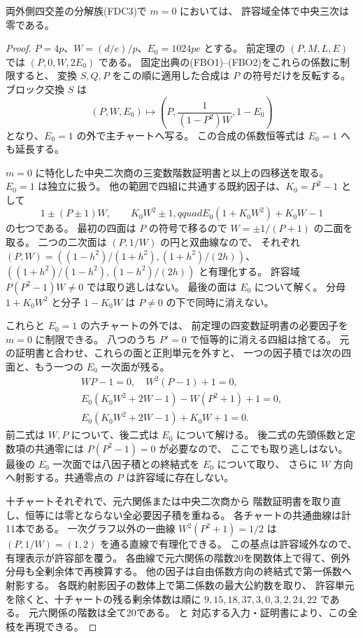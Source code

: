 \begin{proposition}\label{prop:cubic-CY-one-segre-double-split-FDC-mzero}
両外側四交差の分解族(FDC3)で $m=0$ においては、
許容域全体で中央三次は零である。
\end{proposition}
\begin{proof}
$P=4p$、$W=(d/e)/p$、$E_0=1024pe$ とする。
前定理の $(P,M,L,E)$ では $(P,0,W,2E_0)$ である。
固定出典の(FBO1)--(FBO2)をこれらの係数に制限すると、
変換 $S,Q,P$ をこの順に適用した合成は $P$ の符号だけを反転する。
ブロック交換 $S$ は
\[
 (P,W,E_0)\longmapsto
 \left(P,\frac{1}{(1-P^2)W},1-E_0\right)
\]
となり、$E_0=1$ の外で主チャートへ写る。
この合成の係数恒等式は $E_0=1$ へも延長する。

$m=0$ に特化した中央二次商の三変数階数証明書と以上の四移送を取る。
$E_0=1$ は独立に扱う。
他の範囲で四組に共通する既約因子は、$K_0=P^2-1$ として
\[
 1\pm(P\pm1)W,\qquad K_0W^2\pm1,qquad
 E_0(1+K_0W^2)+K_0W-1
\]
の七つである。
最初の四面は $P$ の符号で移るので $W=\pm1/(P+1)$ の二面を取る。
二つの二次面は $(P,1/W)$ の円と双曲線なので、
それぞれ $(P,W)=((1-h^2)/(1+h^2),(1+h^2)/(2h))$、
$((1+h^2)/(1-h^2),(1-h^2)/(2h))$ と有理化する。
許容域 $P(P^2-1)W\ne0$ では取り逃しはない。
最後の面は $E_0$ について解く。
分母 $1+K_0W^2$ と分子 $1-K_0W$ は
$P\ne0$ の下で同時に消えない。

これらと $E_0=1$ の六チャートの外では、
前定理の四変数証明書の必要因子を $m=0$ に制限できる。
八つのうち $P'=0$ で恒等的に消える四組は捨てる。
元の証明書と合わせ、これらの面と正則単元を外すと、
一つの因子積では次の四面と、もう一つの $E_0$ 一次面が残る。
\[
\begin{gathered}
 WP-1=0,\quad W^2(P-1)+1=0,\\
 E_0(K_0W^2+2W-1)-W(P^2+1)+1=0,\\
 E_0(K_0W^2+2W-1)+K_0W+1=0.
\end{gathered}
\]
前二式は $W,P$ について、後二式は $E_0$ について解ける。
後二式の先頭係数と定数項の共通零には $P(P^2-1)=0$ が必要なので、
ここでも取り逃しはない。
最後の $E_0$ 一次面では八因子積との終結式を $E_0$ について取り、
さらに $W$ 方向へ射影する。共通零点の $P$ は許容域に存在しない。

十チャートそれぞれで、元六関係または中央二次商から
階数証明書を取り直し、恒等には零とならない全必要因子積を重ねる。
各チャートの共通曲線は計11本である。
一次グラフ以外の一曲線 $W^2(P^2+1)=1/2$ は
$(P,1/W)=(1,2)$ を通る直線で有理化できる。
この基点は許容域外なので、有理表示が許容部を覆う。
各曲線で元六関係の階数20を関数体上で得て、例外分母も全剰余体で再検算する。
他の因子は自由係数方向の終結式で第一係数へ射影する。
各既約射影因子の数体上で第二係数の最大公約数を取り、
許容単元を除くと、十チャートの残る剰余体数は順に
$9,15,18,37,3,0,3,2,24,22$ である。
元六関係の階数は全て20である。
 と
対応する入力・証明書により、この全枝を再現できる。
\end{proof}


